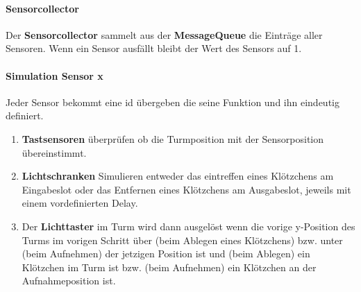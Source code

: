 \paragraph{Sensorcollector}
Der \textbf{Sensorcollector} sammelt aus der \textbf{MessageQueue} die Einträge aller Sensoren. Wenn ein Sensor ausfällt bleibt der Wert des Sensors auf 1.

\paragraph{Simulation Sensor x}
Jeder Sensor bekommt eine id übergeben die seine Funktion und ihn eindeutig definiert. 
\begin{enumerate}
\item \textbf{Tastsensoren} überprüfen ob die Turmposition mit der Sensorposition übereinstimmt.
\item \textbf{Lichtschranken} Simulieren entweder das eintreffen eines Klötzchens am Eingabeslot oder das Entfernen eines Klötzchens am Ausgabeslot, jeweils mit einem vordefinierten Delay. 
\item Der \textbf{Lichttaster} im Turm wird dann ausgelöst wenn die vorige y-Position des Turms im vorigen Schritt über (beim Ablegen eines Klötzchens) bzw. unter (beim Aufnehmen) der jetzigen Position ist und (beim Ablegen) ein Klötzchen im Turm ist bzw. (beim Aufnehmen) ein Klötzchen an der Aufnahmeposition ist.

\end{enumerate}